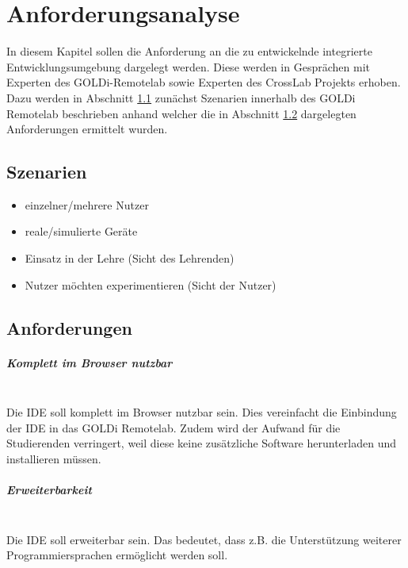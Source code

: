 \chapter{Anforderungsanalyse} \label{anforderungsanalyse}

In diesem Kapitel sollen die Anforderung an die zu entwickelnde integrierte Entwicklungsumgebung dargelegt werden. Diese werden in Gesprächen mit Experten des GOLDi-Remotelab sowie Experten des CrossLab Projekts erhoben. Dazu werden in Abschnitt \ref{szenarien} zunächst Szenarien innerhalb des GOLDi Remotelab beschrieben anhand welcher die in Abschnitt \ref{anforderungen} dargelegten Anforderungen ermittelt wurden.

\section{Szenarien} \label{szenarien}

\begin{itemize}
    \item einzelner/mehrere Nutzer
    \item reale/simulierte Geräte
    \item Einsatz in der Lehre (Sicht des Lehrenden)
    \item Nutzer möchten experimentieren (Sicht der Nutzer)
\end{itemize}

\section{Anforderungen} \label{anforderungen}

\paragraph{Komplett im Browser nutzbar} \mbox{} \\
Die IDE soll komplett im Browser nutzbar sein. Dies vereinfacht die Einbindung der IDE in das GOLDi Remotelab. Zudem wird der Aufwand für die Studierenden verringert, weil diese keine zusätzliche Software herunterladen und installieren müssen.

\paragraph{Erweiterbarkeit} \mbox{} \\
Die IDE soll erweiterbar sein. Das bedeutet, dass z.B. die Unterstützung weiterer Programmiersprachen ermöglicht werden soll.

